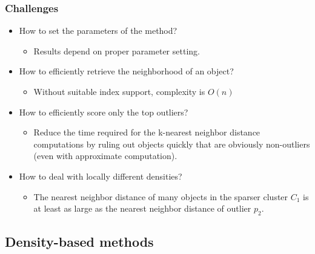 \documentclass[../notes.tex]{subfiles}
\begin{document}
\subsubsection{Challenges}
\begin{itemize}
  \item How to set the parameters of the method?
  \begin{itemize}
    \item Results depend on proper parameter setting.
  \end{itemize}

  \item How to efficiently retrieve the neighborhood of an object?
  \begin{itemize}
    \item Without suitable index support, complexity is $O(n)$
  \end{itemize}

  \item How to efficiently score only the top outliers?
  \begin{itemize}
    \item Reduce the time required for the k-nearest neighbor distance computations by ruling out objects quickly that are obviously non-outliers (even with approximate computation).
  \end{itemize}

  \item How to deal with locally different densities?
  \begin{itemize}
    \item The nearest neighbor distance of many objects in the sparser cluster $C_1$ is at least as large as the nearest neighbor distance of outlier $p_2$.
  \end{itemize}
\end{itemize}

\newpage

\subsection{Density-based methods}
\end{document}

